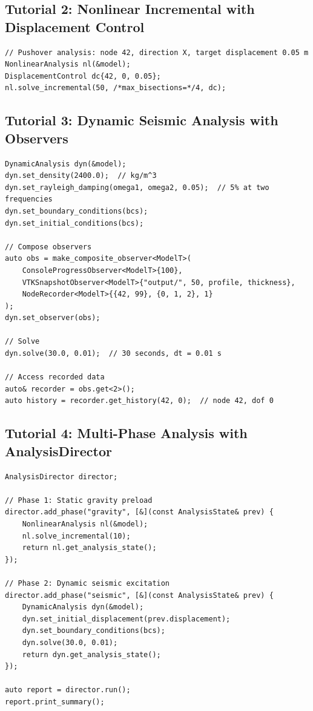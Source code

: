 \subsection{Tutorial 2: Nonlinear Incremental with Displacement Control}
\label{sec:arch:tut:pushover}

\begin{verbatim}
// Pushover analysis: node 42, direction X, target displacement 0.05 m
NonlinearAnalysis nl(&model);
DisplacementControl dc{42, 0, 0.05};
nl.solve_incremental(50, /*max_bisections=*/4, dc);
\end{verbatim}


\subsection{Tutorial 3: Dynamic Seismic Analysis with Observers}
\label{sec:arch:tut:seismic}

\begin{verbatim}
DynamicAnalysis dyn(&model);
dyn.set_density(2400.0);  // kg/m^3
dyn.set_rayleigh_damping(omega1, omega2, 0.05);  // 5% at two frequencies
dyn.set_boundary_conditions(bcs);
dyn.set_initial_conditions(bcs);

// Compose observers
auto obs = make_composite_observer<ModelT>(
    ConsoleProgressObserver<ModelT>{100},
    VTKSnapshotObserver<ModelT>{"output/", 50, profile, thickness},
    NodeRecorder<ModelT>{{42, 99}, {0, 1, 2}, 1}
);
dyn.set_observer(obs);

// Solve
dyn.solve(30.0, 0.01);  // 30 seconds, dt = 0.01 s

// Access recorded data
auto& recorder = obs.get<2>();
auto history = recorder.get_history(42, 0);  // node 42, dof 0
\end{verbatim}


\subsection{Tutorial 4: Multi-Phase Analysis with AnalysisDirector}
\label{sec:arch:tut:multiphase}

\begin{verbatim}
AnalysisDirector director;

// Phase 1: Static gravity preload
director.add_phase("gravity", [&](const AnalysisState& prev) {
    NonlinearAnalysis nl(&model);
    nl.solve_incremental(10);
    return nl.get_analysis_state();
});

// Phase 2: Dynamic seismic excitation
director.add_phase("seismic", [&](const AnalysisState& prev) {
    DynamicAnalysis dyn(&model);
    dyn.set_initial_displacement(prev.displacement);
    dyn.set_boundary_conditions(bcs);
    dyn.solve(30.0, 0.01);
    return dyn.get_analysis_state();
});

auto report = director.run();
report.print_summary();
\end{verbatim}


